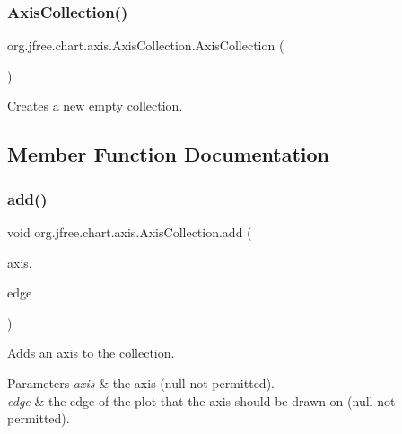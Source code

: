 \subsubsection{\texorpdfstring{Axis\+Collection()}{AxisCollection()}}
{\footnotesize\ttfamily org.\+jfree.\+chart.\+axis.\+Axis\+Collection.\+Axis\+Collection (\begin{DoxyParamCaption}{ }\end{DoxyParamCaption})}

Creates a new empty collection. 

\subsection{Member Function Documentation}
\mbox{\label{classorg_1_1jfree_1_1chart_1_1axis_1_1_axis_collection_add5e53fc802e7ef26056bf6274dbd5fd}} 
\subsubsection{\texorpdfstring{add()}{add()}}
{\footnotesize\ttfamily void org.\+jfree.\+chart.\+axis.\+Axis\+Collection.\+add (\begin{DoxyParamCaption}\item[{\mbox{\hyperlink{classorg_1_1jfree_1_1chart_1_1axis_1_1_axis}{Axis}}}]{axis,  }\item[{Rectangle\+Edge}]{edge }\end{DoxyParamCaption})}

Adds an axis to the collection.


\begin{DoxyParams}{Parameters}
{\em axis} & the axis ({\ttfamily null} not permitted). \\
\hline
{\em edge} & the edge of the plot that the axis should be drawn on ({\ttfamily null} not permitted). \\
\hline
\end{DoxyParams}
\mbox{\label{classorg_1_1jfree_1_1chart_1_1axis_1_1_axis_collection_a78370f10d2bf3201bf60b9e319ccfb8d}} 
